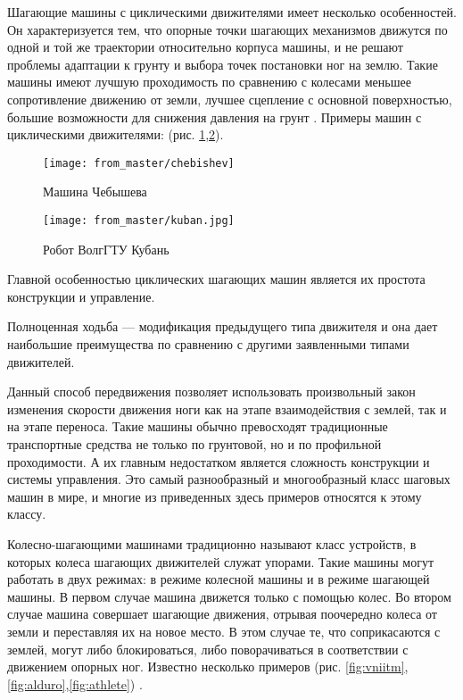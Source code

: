 Шагающие машины с циклическими движителями имеет несколько особенностей. Он характеризуется тем, что опорные точки шагающих механизмов движутся по одной и той же траектории относительно корпуса машины, и не решают проблемы адаптации к грунту и выбора точек постановки ног на землю. Такие машины имеют лучшую проходимость по сравнению с колесами меньшее сопротивление движению от земли, лучшее сцепление с основной поверхностью, большие возможности для снижения давления на грунт \cite{cruse2001control}. Примеры машин с циклическими движителями: (рис. \ref{fig:chebishev},\ref{fig:kuban}).

\begin{figure}[H]
\centering\texttt{[image: from\_master/chebishev]}
\caption{Машина Чебышева}
\label{fig:chebishev}
\end{figure}

\begin{figure}[H]
\centering\texttt{[image: from\_master/kuban.jpg]}
\caption{Робот ВолгГТУ Кубань}
\label{fig:kuban}
\end{figure}

Главной особенностью циклических шагающих машин является их простота конструкции и управление. 

Полноценная ходьба --- модификация предыдущего типа движителя и она дает наибольшие преимущества по сравнению с другими заявленными типами движителей. 

Данный способ передвижения позволяет использовать произвольный закон изменения скорости движения ноги как на этапе взаимодействия с землей, так и на этапе переноса. Такие машины обычно превосходят традиционные транспортные средства не только по грунтовой, но и по профильной проходимости. А их главным недостатком является сложность конструкции и системы управления. Это самый разнообразный и многообразный класс шаговых машин в мире, и многие из приведенных здесь примеров относятся к этому классу. 

Колесно-шагающими машинами традиционно называют класс устройств, в которых колеса шагающих движителей служат упорами. Такие машины могут работать в двух режимах: в режиме колесной машины и в режиме шагающей машины. В первом случае машина движется только с помощью колес. Во втором случае машина совершает шагающие движения, отрывая поочередно колеса от земли и переставляя их на новое место. В этом случае те, что соприкасаются с землей, могут либо блокироваться, либо поворачиваться в соответствии с движением опорных ног.
Известно несколько примеров (рис. \ref{fig:vniitm},\ref{fig:alduro},\ref{fig:athlete}) \cite{germann2001joystick}.

